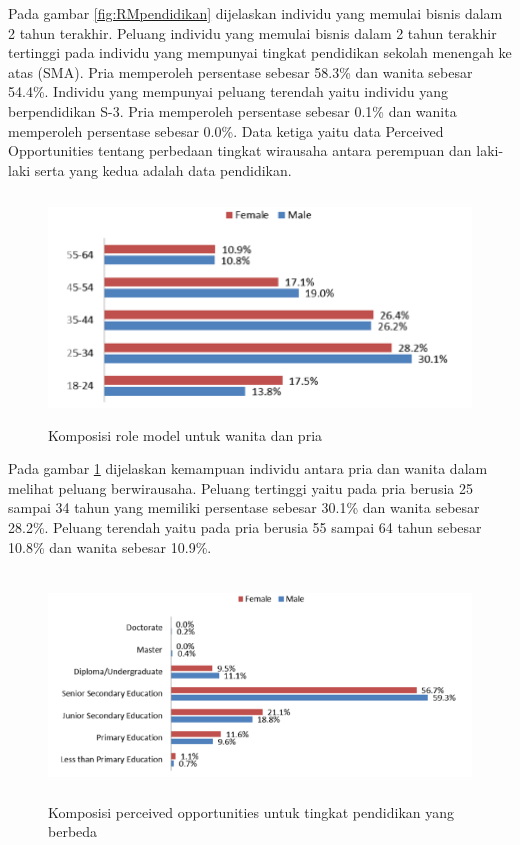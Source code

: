 Pada gambar \ref{fig:RMpendidikan} dijelaskan individu yang memulai bisnis dalam 2 tahun terakhir. Peluang individu yang memulai bisnis dalam 2 tahun terakhir tertinggi pada individu yang mempunyai tingkat pendidikan sekolah menengah ke atas (SMA). Pria memperoleh persentase sebesar 58.3\% dan wanita sebesar 54.4\%. Individu yang mempunyai peluang terendah yaitu individu yang berpendidikan S-3. Pria memperoleh persentase sebesar 0.1\% dan wanita memperoleh persentase sebesar 0.0\%. Data ketiga yaitu data Perceived Opportunities tentang perbedaan tingkat wirausaha antara perempuan dan laki-laki serta yang kedua adalah data pendidikan.

\begin{figure} [H]
	\centering  
	\includegraphics[width=12cm, height=6cm]{POfemalemale} 
	\caption[Komposisi role model untuk wanita dan pria]{Komposisi role model untuk wanita dan pria} 
	\label{fig:POfemalemale} 
\end{figure} 

Pada gambar \ref{fig:POfemalemale} dijelaskan kemampuan individu antara pria dan wanita dalam melihat peluang berwirausaha. Peluang tertinggi yaitu pada pria berusia 25 sampai 34 tahun yang memiliki persentase sebesar 30.1\% dan wanita sebesar 28.2\%. Peluang terendah yaitu pada pria berusia 55 sampai 64 tahun sebesar 10.8\% dan wanita sebesar 10.9\%. 

\begin{figure} [H]
	\centering  
	\includegraphics[width=14cm, height=6cm]{POpendidikan} 
	\caption[Komposisi perceived opportunities untuk tingkat pendidikan yang berbeda]{Komposisi perceived opportunities untuk tingkat pendidikan yang berbeda} 
	\label{fig:POpendidikan} 
\end{figure}  

